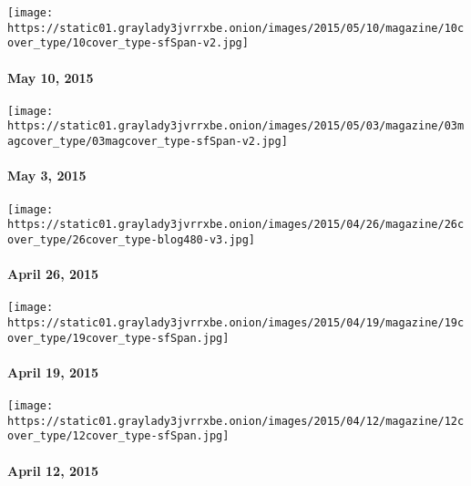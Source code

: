 \href{http://www.nytimes3xbfgragh.onion/indexes/2015/05/10/magazine/index.html}{}

\texttt{[image: https://static01.graylady3jvrrxbe.onion/images/2015/05/10/magazine/10cover\_type/10cover\_type-sfSpan-v2.jpg]}

\hypertarget{may-10-2015}{%
\paragraph{May 10, 2015}\label{may-10-2015}}

\href{http://www.nytimes3xbfgragh.onion/indexes/2015/05/03/magazine/index.html}{}

\texttt{[image: https://static01.graylady3jvrrxbe.onion/images/2015/05/03/magazine/03magcover\_type/03magcover\_type-sfSpan-v2.jpg]}

\hypertarget{may-3-2015}{%
\paragraph{May 3, 2015}\label{may-3-2015}}

\href{http://www.nytimes3xbfgragh.onion/indexes/2015/04/26/magazine/index.html}{}

\texttt{[image: https://static01.graylady3jvrrxbe.onion/images/2015/04/26/magazine/26cover\_type/26cover\_type-blog480-v3.jpg]}

\hypertarget{april-26-2015}{%
\paragraph{April 26, 2015}\label{april-26-2015}}

\href{http://www.nytimes3xbfgragh.onion/indexes/2015/04/19/magazine/index.html}{}

\texttt{[image: https://static01.graylady3jvrrxbe.onion/images/2015/04/19/magazine/19cover\_type/19cover\_type-sfSpan.jpg]}

\hypertarget{april-19-2015}{%
\paragraph{April 19, 2015}\label{april-19-2015}}

\href{http://www.nytimes3xbfgragh.onion/indexes/2015/04/12/magazine/index.html}{}

\texttt{[image: https://static01.graylady3jvrrxbe.onion/images/2015/04/12/magazine/12cover\_type/12cover\_type-sfSpan.jpg]}

\hypertarget{april-12-2015}{%
\paragraph{April 12, 2015}\label{april-12-2015}}

